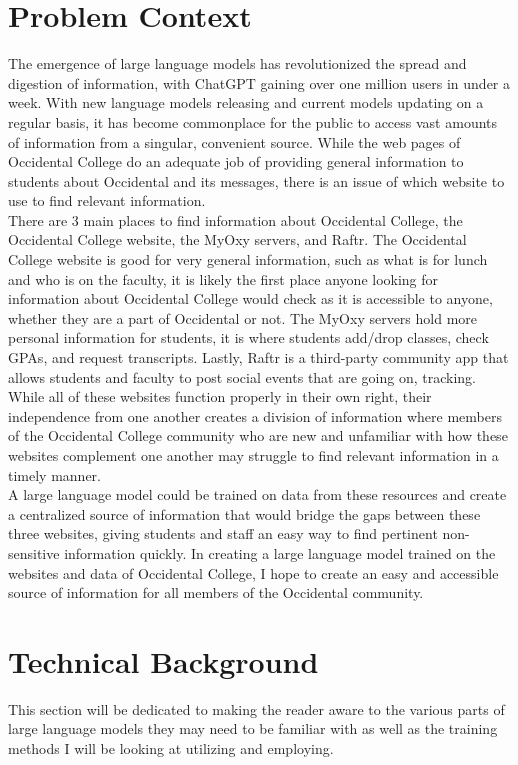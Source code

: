 \documentclass[10pt,twocolumn]{article}
\begin{document}
\section{Problem Context}
The emergence of large language models has revolutionized the spread and digestion of information, with ChatGPT gaining over one million users in under a week\cite{noauthor_number_2023}. With new language models releasing and current models updating on a regular basis, it has become commonplace for the public to access vast amounts of information from a singular, convenient source\cite{lammertyn_60_nodate}. While the web pages of Occidental College do an adequate job of providing general information to students about Occidental and its messages, there is an issue of which website to use to find relevant information.\\ \indent There are 3 main places to find information about Occidental College, the Occidental College website, the MyOxy servers, and Raftr. The Occidental College website is good for very general information, such as what is for lunch and who is on the faculty, it is likely the first place anyone looking for information about Occidental College would check as it is accessible to anyone, whether they are a part of Occidental or not. The MyOxy servers hold more personal information for students, it is where students add/drop classes, check GPAs, and request transcripts. Lastly, Raftr is a third-party community app that allows students and faculty to post social events that are going on, tracking. While all of these websites function properly in their own right, their independence from one another creates a division of information where members of the Occidental College community who are new and unfamiliar with how these websites complement one another may struggle to find relevant information in a timely manner.\\ \indent A large language model could be trained on data from these resources and create a centralized source of information that would bridge the gaps between these three websites, giving students and staff an easy way to find pertinent non-sensitive information quickly. In creating a large language model trained on the websites and data of Occidental College, I hope to create an easy and accessible source of information for all members of the Occidental community.


\section{Technical Background}
This section will be dedicated to making the reader aware to the various parts of large language models they may need to be familiar with as well as the training methods I will be looking at utilizing and employing.
\end{document}

